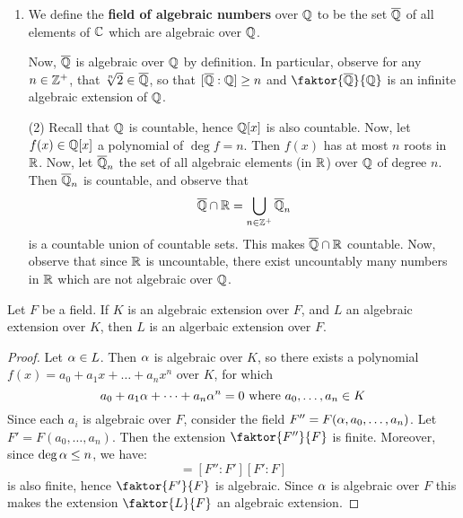 \begin{example}\label{example_8.9}
  \begin{enumerate}
    \item We define the \textbf{field of algebraic numbers} over $\mathbb{Q}$
      to be the set $\overline{\mathbb{Q}}$ of all elements of $\mathbb{C}$ which are
      algebraic over $\mathbb{Q}$.

      Now, $\overline{\mathbb{Q}}$ is algebraic over $\mathbb{Q}$ by definition. In
      particular, observe for any $n \in \mathbb{Z}^+$, that $\sqrt[n]{2}
      \in \overline{\mathbb{Q}}$, so that $[\overline{\mathbb{Q}}:\mathbb{Q}] \geq n$ and
      $\faktor{\bar{\Q}}{\Q}$ is an infinite algebraic extension of
      $\mathbb{Q}$.

    \item[(2)] Recall that $\mathbb{Q}$ is countable, hence $\mathbb{Q}[x]$ is also
      countable. Now, let $f(x) \in \mathbb{Q}[x]$ a polynomial of
      $\deg{f}=n$. Then $f(x)$ has at most $n$ roots in $\mathbb{R}$. Now, let
      $\overline{\mathbb{Q}}_n$ the set of all algebraic elements (in $\mathbb{R}$) over
      $\mathbb{Q}$ of degree $n$. Then $\overline{\mathbb{Q}}_n$ is countable, and observe
      that
      \begin{equation*}
        \overline{\mathbb{Q}} \cap \mathbb{R}=\bigcup_{n \in \mathbb{Z}^+}{\overline{\mathbb{Q}}_n}
      \end{equation*}
      is a countable union of countable sets. This makes $\overline{\mathbb{Q}}
      \cap \mathbb{R}$ countable. Now, observe that since $\mathbb{R}$ is uncountable,
      there exist uncountably many numbers in  $\mathbb{R}$ which are not
      algebraic over $\mathbb{Q}$.
  \end{enumerate}
\end{example}

\begin{theorem}\label{theorem_8.2.8}
  Let $F$ be a field. If $K$ is an algebraic extension over $F$, and
  $L$ an algebraic extension over  $K$, then  $L$ is an algerbaic
  extension over  $F$.
\end{theorem}
\begin{proof}
  Let $\alpha \in L$. Then $\alpha$ is algebraic over  $K$, so there exists a
  polynomial $f(x)=a_0+a_1x+\dots+a_nx^n$ over $K$, for which
  \begin{equation*}
    a_0+a_1\alpha+\dots+a_n\alpha^n=0 \text{ where } a_0, \dots, a_n \in K
  \end{equation*}
  Since each $a_i$ is algebraic over $F$, consider the field
  $F''=F(\alpha,a_0,\dots,a_n)$. Let $F'=F(a_0, \dots, a_n)$. Then the
  extension $\faktor{F''}{F}$ is finite. Moreover, since $\deg{\alpha}
  \leq n$, we have:
  \begin{equation*}
    [F'':F]=[F'':F'][F':F]
  \end{equation*}
  is also finite, hence $\faktor{F'}{F}$ is algebraic. Since $\alpha$ is
  algebraic over $F$ this makes the extension $\faktor{L}{F}$
  an algebraic extension.
\end{proof}

